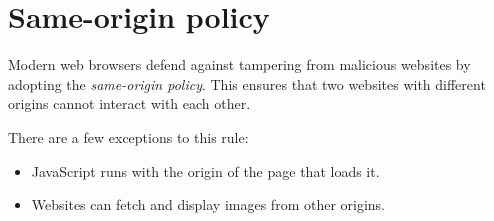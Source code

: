 \section{Same-origin policy}
Modern web browsers defend against tampering from malicious websites by adopting the \emph{same-origin policy}. This ensures that two websites with different origins cannot interact with each other.

\medskip
There are a few exceptions to this rule:
\begin{itemize}
    \item JavaScript runs with the origin of the page that loads it.
    \item Websites can fetch and display images from other origins.
\end{itemize}
